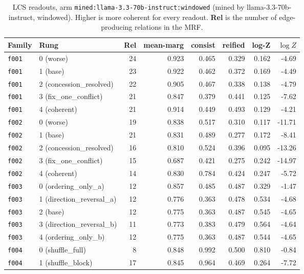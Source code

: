 \documentclass[11pt]{article}
\begin{document}
\begin{table}[htbp]
\centering
\small
\caption{LCS readouts, arm \texttt{mined:llama-3.3-70b-instruct:windowed} (mined by llama-3.3-70b-instruct, windowed). Higher is more coherent for every readout. \textbf{Rel} is the number of edge-producing relations in the MRF.}
\label{tab:scores-mined-llama-3-3-70b-instruct-windowed}
\begin{tabular}{llrrrrrr}
\toprule
Family & Rung & Rel & \textbf{mean-marg} & \textbf{consist} & \textbf{reified} & \textbf{log-Z} & $\log Z$ \\
\midrule
\texttt{f001} & 0 (worse) & 24 & 0.923 & 0.465 & 0.329 & 0.162 & -4.69 \\
\texttt{f001} & 1 (base) & 23 & 0.922 & 0.462 & 0.372 & 0.169 & -4.49 \\
\texttt{f001} & 2 (concession\_resolved) & 22 & 0.905 & 0.467 & 0.338 & 0.138 & -4.79 \\
\texttt{f001} & 3 (fix\_one\_conflict) & 21 & 0.847 & 0.379 & 0.441 & 0.125 & -7.62 \\
\texttt{f001} & 4 (coherent) & 21 & 0.914 & 0.449 & 0.493 & 0.129 & -4.21 \\
\midrule
\texttt{f002} & 0 (worse) & 19 & 0.838 & 0.517 & 0.310 & 0.117 & -11.71 \\
\texttt{f002} & 1 (base) & 21 & 0.831 & 0.489 & 0.277 & 0.172 & -8.41 \\
\texttt{f002} & 2 (concession\_resolved) & 16 & 0.810 & 0.524 & 0.396 & 0.095 & -13.26 \\
\texttt{f002} & 3 (fix\_one\_conflict) & 15 & 0.687 & 0.421 & 0.275 & 0.242 & -14.97 \\
\texttt{f002} & 4 (coherent) & 14 & 0.830 & 0.784 & 0.424 & 0.247 & -5.72 \\
\midrule
\texttt{f003} & 0 (ordering\_only\_a) & 12 & 0.857 & 0.485 & 0.487 & 0.329 & -1.47 \\
\texttt{f003} & 1 (direction\_reversal\_a) & 12 & 0.776 & 0.363 & 0.478 & 0.534 & -4.68 \\
\texttt{f003} & 2 (base) & 12 & 0.775 & 0.363 & 0.487 & 0.545 & -4.65 \\
\texttt{f003} & 3 (direction\_reversal\_b) & 11 & 0.773 & 0.383 & 0.479 & 0.564 & -4.64 \\
\texttt{f003} & 4 (ordering\_only\_b) & 12 & 0.775 & 0.363 & 0.487 & 0.544 & -4.65 \\
\midrule
\texttt{f004} & 0 (shuffle\_full) & 8 & 0.848 & 0.992 & 0.500 & 0.810 & -0.84 \\
\texttt{f004} & 1 (shuffle\_block) & 17 & 0.845 & 0.964 & 0.469 & 0.264 & -7.72 \\

\end{tabular}
\end{table}
\end{document}
